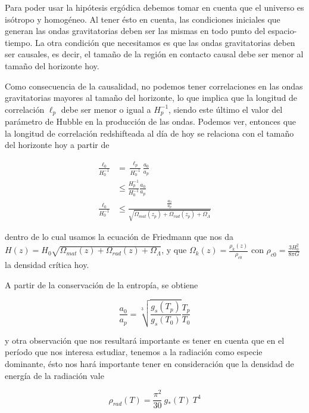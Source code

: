 Para poder usar la hipótesis ergódica debemos tomar en cuenta que el universo es isótropo y homogéneo. Al tener ésto en cuenta, las condiciones iniciales que generan las ondas gravitatorias deben ser las mismas en todo punto del espacio-tiempo. La otra condición que necesitamos es que las ondas gravitatorias deben ser causales, es decir, el tamaño de la región en contacto causal debe ser menor al tamaño del horizonte hoy. 

Como consecuencia de la causalidad, no podemos tener correlaciones en las ondas gravitatorias mayores al tamaño del horizonte, lo que implica que la longitud de correlación $\ell_p$ debe ser menor o igual a $H_p^{-1}$, siendo este último el valor del parámetro de Hubble en la producción de las ondas. Podemos ver, entonces que la longitud de correlación redshifteada al día de hoy se relaciona con el tamaño del horizonte hoy a partir de

\begin{equation}
    \begin{split}
        \frac{\ell_0}{H_0^{-1}} &= \frac{\ell_p}{H_0^{-1}} \frac{a_0}{a_p}\\
        &\leq \frac{H_p^{-1}}{H_0^{-1}} \frac{a_0}{a_p}\\
        \frac{\ell_0}{H_0^{-1}} &\leq \frac{\displaystyle \frac{a_0}{a_p}}{\sqrt{\Omega_{mat} (z_p) + \Omega_{rad} (z_p) + \Omega_\Lambda}}
    \end{split}
\end{equation}

\noindent
dentro de lo cual usamos la ecuación de Friedmann que nos da $H(z) = H_0 \sqrt{\Omega_{mat} (z) + \Omega_{rad} (z) + \Omega_\Lambda}$, y que $\Omega_k (z) = \displaystyle \frac{\rho_k (z)}{\rho_{c0}}$ con $\rho_{c0} = \displaystyle \frac{3 H_0^2}{8 \pi G}$ la densidad crítica hoy.

A partir de la conservación de la entropía, se obtiene 

\begin{equation}
    \frac{a_0}{a_p} = \sqrt[3]{\frac{g_s (T_p)}{g_s(T_0)}} \frac{T_p}{T_0}
\end{equation}

\noindent
y otra observación que nos resultará importante es tener en cuenta que en el período que nos interesa estudiar, tenemos a la radiación como especie dominante, ésto nos hará importante tener en consideración que la densidad de energía de la radiación vale

\begin{equation}
    \rho_{rad} (T)  = \frac{\pi^2}{30} \  g_* (T) \ T^4
\end{equation}

